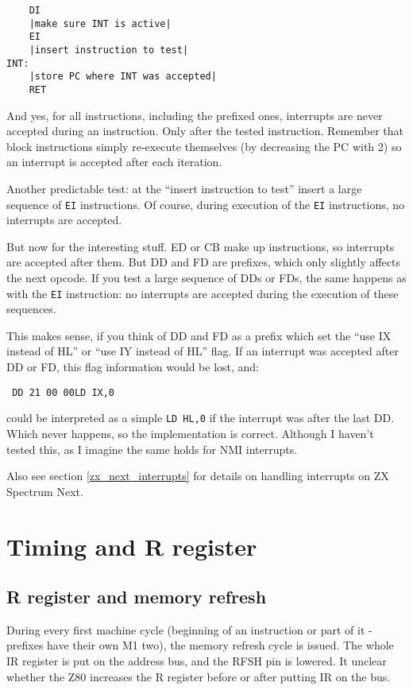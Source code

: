 \begin{lstlisting}
    DI
    |make sure INT is active|
    EI
    |insert instruction to test|
INT:
    |store PC where INT was accepted|
    RET
\end{lstlisting}

And yes, for all instructions, including the prefixed ones, interrupts are never accepted during an instruction. Only after the tested instruction. Remember that block instructions simply re-execute themselves (by decreasing the PC with 2) so an interrupt is accepted after each iteration.

Another predictable test: at the ``insert instruction to test'' insert a large sequence of {\tt EI} instructions. Of course, during execution of the {\tt EI} instructions, no interrupts are accepted. 

But now for the interesting stuff. ED or CB make up instructions, so interrupts are accepted after them. But DD and FD are prefixes, which only slightly affects the next opcode. If you test a large sequence of DDs or FDs, the same happens as with the {\tt EI} instruction: no interrupts are accepted during the execution of these sequences.

This makes sense, if you think of DD and FD as a prefix which set the ``use IX instead of HL'' or ``use IY instead of HL'' flag. If an interrupt was accepted after DD or FD, this flag information would be lost, and:

{\tt 
    {\qquad}DD 21 00 00{\qquad}LD IX,0
}

could be interpreted as a simple {\tt LD HL,0} if the interrupt was after the last DD. Which never happens, so the implementation is correct. Although I haven't tested this, as I imagine the same holds for NMI interrupts.

Also see section \ref{zx_next_interrupts} for details on handling interrupts on ZX Spectrum Next.


\pagebreak
\section{Timing and R register}

\subsection{R register and memory refresh}

During every first machine cycle (beginning of an instruction or part of it - prefixes have their own M1 two), the memory refresh cycle is issued. The whole IR register is put on the address bus, and the RFSH pin is lowered.  It unclear whether the Z80 increases the R register before or after putting IR on the bus. 


